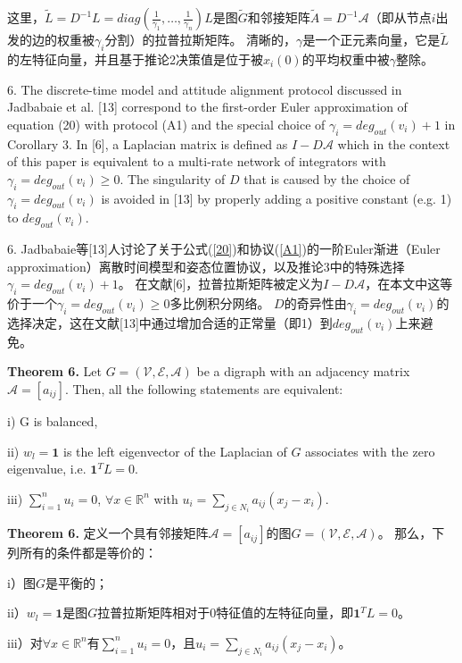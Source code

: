 \documentclass{article}
\begin{document}
\noindent 这里，$\tilde{L} = D^{-1}L = diag(\frac{1}{\gamma_1},\dots,\frac{1}{\gamma_n})L$是图$\tilde{G}$和邻接矩阵$\tilde{A}=D^{-1}\mathcal{A}$（即从节点$i$出发的边的权重被$\gamma_i$分割）的拉普拉斯矩阵。
清晰的，$\gamma$是一个正元素向量，它是$\tilde{L}$的左特征向量，并且基于推论2决策值是位于被$x_i(0)$的平均权重中被$\gamma$整除。

{\color[gray]{0.5}
 6. The discrete-time model and attitude alignment protocol discussed in Jadbabaie et al. [13] correspond to the ﬁrst-order Euler approximation of equation (20) with protocol (A1) and the special choice of $\gamma_i=deg_{out}(v_i)+1$ in Corollary 3. 
In [6], a Laplacian matrix is deﬁned as $I-D\mathcal{A}$ which in the context of this paper is equivalent to a multi-rate network of integrators with $\gamma_i=deg_{out}(v_i)\ge 0$. 
The singularity of $D$ that is caused by the choice of $\gamma_i=deg_{out}(v_i)$ is avoided in [13] by properly adding a positive constant (e.g. 1) to $deg_{out}(v_i)$.
}

 6. Jadbabaie等[13]人讨论了关于公式(\ref{20})和协议(\ref{A1})的一阶Euler渐进（Euler approximation）离散时间模型和姿态位置协议，以及推论3中的特殊选择$\gamma_i=deg_{out}(v_i)+1$。
在文献[6]，拉普拉斯矩阵被定义为$I-D\mathcal{A}$，在本文中这等价于一个$\gamma_i=deg_{out}(v_i)\ge 0$多比例积分网络。
$D$的奇异性由$\gamma_i=deg_{out}(v_i)$的选择决定，这在文献[13]中通过增加合适的正常量（即1）到$deg_{out}(v_i)$上来避免。

{\color[gray]{0.5}
\noindent \textbf{Theorem 6.} Let $G=(\mathcal{V}, \mathcal{E}, \mathcal{A})$ be a digraph with an adjacency matrix $\mathcal{A}=[a_{ij}]$. 
Then, all the following statements are equivalent:

i) G is balanced, 

ii) $w_l = \mathbf{1}$ is the left eigenvector of the Laplacian of $G$ associates with the zero eigenvalue, i.e. $\mathbf{1}^TL = 0$.

iii) $\sum_{i=1}^n u_i = 0$, $\forall x \in \mathbb{R}^n$ with $u_i = \sum_{j\in N_i}a_{ij}(x_j - x_i)$.
}

\noindent \textbf{Theorem 6.} 定义一个具有邻接矩阵$\mathcal{A}=[a_{ij}]$的图$G=(\mathcal{V}, \mathcal{E}, \mathcal{A})$。
那么，下列所有的条件都是等价的：

i）图$G$是平衡的；

ii）$w_l = \mathbf{1}$是图$G$拉普拉斯矩阵相对于0特征值的左特征向量，即$\mathbf{1}^TL = 0$。

iii）对$\forall x \in \mathbb{R}^n$有$\sum_{i=1}^n u_i = 0$，且$u_i = \sum_{j\in N_i}a_{ij}(x_j - x_i)$。
\end{document}
